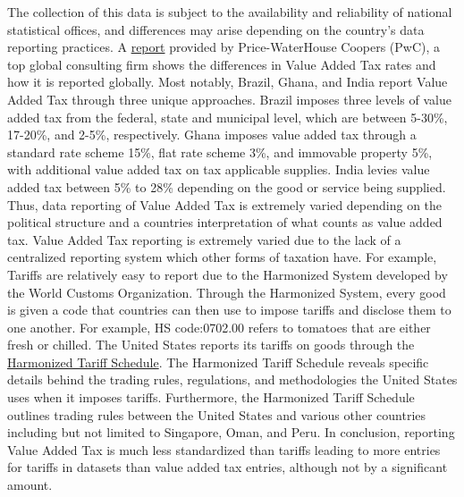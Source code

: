 \documentclass[12pt]{article}
\begin{document}
The collection of this data is subject to the availability and reliability of national statistical offices, and differences may arise depending on the country’s data reporting practices. A \href{https://taxsummaries.pwc.com/quick-charts/value-added-tax-vat-rates}{report} provided by Price-WaterHouse Coopers (PwC), a top global consulting firm shows the differences in Value Added Tax rates and how it is reported globally. Most notably, Brazil, Ghana, and India report Value Added Tax through three unique approaches. Brazil imposes three levels of value added tax from the federal, state and municipal level, which are between 5-30\%, 17-20\%, and 2-5\%, respectively. Ghana imposes value added tax through a standard rate scheme 15\%, flat rate scheme 3\%, and immovable property 5\%, with additional value added tax on tax applicable supplies. India levies value added tax between 5\% to 28\% depending on the good or service being supplied. Thus, data reporting of Value Added Tax is extremely varied depending on the political structure and a countries interpretation of what counts as value added tax. Value Added Tax reporting is extremely varied due to the lack of a centralized reporting system which other forms of taxation have. For example, Tariffs are relatively easy to report due to the Harmonized System developed by the World Customs Organization. Through the Harmonized System, every good is given a code that countries can then use to impose tariffs and disclose them to one another. For example, HS code:0702.00 refers to tomatoes that are either fresh or chilled. The United States reports its tariffs on goods through the \href{https://hts.usitc.gov/}{Harmonized Tariff Schedule}. The Harmonized Tariff Schedule reveals specific details behind the trading rules, regulations, and methodologies the United States uses when it imposes tariffs. Furthermore, the Harmonized Tariff Schedule outlines trading rules between the United States and various other countries including but not limited to Singapore, Oman, and Peru. In conclusion, reporting Value Added Tax is much less standardized than tariffs leading to more entries for tariffs in datasets than value added tax entries, although not by a significant amount.
\end{document}
